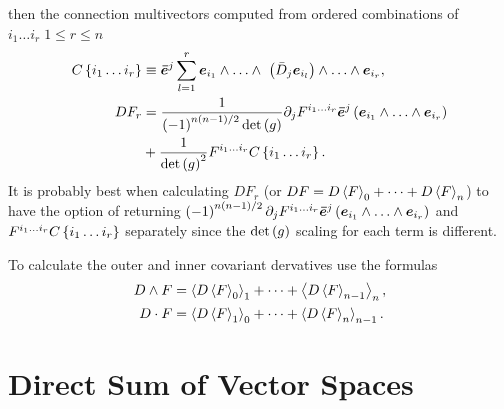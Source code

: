 then the connection multivectors computed from ordered combinations of $i_{1}\dots i_{r}\;1\le r \le n$
\begin{align}
    C\lb i_{1}\dots i_{r}\rb &\equiv \bm{\bar{e}}^{j}\sum_{l=1}^{r}\bm{e}_{i_{1}}\W\dots\W\
                                    \paren{\bar{D}_{j}\bm{e}_{i_{l}}}\W\dots\W\bm{e}_{i_{r}}\label{mani_22}, \\
    DF_{r} &= \bfrac{1}{\paren{-1}^{n(n-1)/2}\f{\det}{g}}\partial_{j}F^{i_{1}\dots i_{r}}\bm{\bar{e}}^{j}\paren{\bm{e}_{i_{1}}
              \W\dots\W\bm{e}_{i_{r}}} \nonumber \\
           & +\bfrac{1}{\f{\det}{g}^{2}}F^{i_{1}\dots i_{r}}C\lb i_{1}\dots i_{r}\rb\label{mani_23}.
\end{align}
It is probably best when calculating $DF_{r}$ (or $DF = D\left \langle {F} \right \rangle_{0}+\cdots+D\left \langle {F} \right \rangle_{n}$) to have
the option of returning $\paren{-1}^{n(n-1)/2}\partial_{j}F^{i_{1}\dots i_{r}}\bm{\bar{e}}^{j}\paren{\bm{e}_{i_{1}}\W\dots\W\bm{e}_{i_{r}}}$ and 
$F^{i_{1}\dots i_{r}}C\left \{ i_{1}\dots i_{r}\right \}$ separately since the ${\det}\left ( {g} \right )$ scaling for each term is different.

To calculate the outer and inner covariant dervatives use the formulas
\begin{align}
    D\W F &= \grd{D\grd{F}{0}}{1}+\cdots+\grd{D\grd{F}{n-1}}{n}, \label{mani_{24}} \\
    D\cdot F &= \grd{D\grd{F}{1}}{0}+\cdots+\grd{D\grd{F}{n}}{n-1}. \label{mani_{25}} 
\end{align}

\chapter{Direct Sum of Vector Spaces}\label{DSVS}

